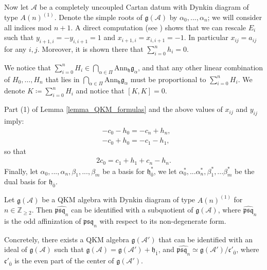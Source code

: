 \documentclass[12pt, a4paper, reqno]{amsart}
\def\AA{\mathcal{A}}
\def\ol{\overline}
\theoremstyle{definition}
\theoremstyle{definition}
\theoremstyle{definition}
\numberwithin{theorem}{section}
\numberwithin{lemma}{section}
\numberwithin{remark}{section}
\numberwithin{definition}{section}
\numberwithin{corollary}{section}
\numberwithin{proposition}{section}
\numberwithin{example}{section}
\begin{document}
	Now let $\AA$ be a completely uncoupled Cartan datum with Dynkin diagram of type $A(n)^{(1)}$.  Denote the simple roots of \(\mathfrak{g}(\mathcal{A})\) by \(\alpha_0,...,\alpha_n\); we will consider all indices mod \(n+1\).  A direct computation (see \cite{Si}) shows that we can rescale \(E_i\) such that \(y_{i+1,i} = - y_{i,i+1} = 1\) and \(x_{i+1,i} = x_{i,i+1} = -1\). In particular \(x_{ij} = a_{ij}\) for any \(i,j\). Moreover, it is shown there that \(\sum_{i=0}^n h_i = 0\). \par
	We notice that \(\sum_{i=0}^n H_i \in \bigcap_{\alpha\in\Pi}\mathrm{Ann}_{\mathfrak{h}}\mathfrak{g}_{\alpha}\), and that any other linear combination of \(H_0,\dots,H_n\) that lies in $\bigcap_{\alpha\in\Pi}\mathrm{Ann}_{\mathfrak{h}}\mathfrak{g}_{\alpha}$ must be proportional to \(\sum_{i=0}^n H_i\). 	We denote \(K \coloneq \sum_{i=0}^n H_i\) and notice that \([K,K] = 0\). 
	
	Part (1) of Lemma \ref{lemma_QKM_formulas} and the above values of \(x_{ij}\) and \(y_{ij}\) imply:
	\begin{align*}
		&-c_0 - h_0 = -c_n + h_n, \\
		&-c_0 + h_0 = -c_1 - h_1,
	\end{align*}
	so that
	\begin{align}\label{equation-psqn-realtions}
		2c_0 = c_1 + h_1 + c_n - h_n. 
	\end{align}
	Finally, let \(\alpha_0,...,\alpha_n,\beta_1,...,\beta_m\) be a basis for \(\mathfrak{h}_{\ol{0}}^*\), we let \(\alpha_0^*,...\alpha_n^*,\beta_1^*,...\beta_m^*\) be the dual basis for \(\mathfrak{h}_{\ol{0}}\).
	
	\begin{theorem}
		Let \(\mathfrak{g}(\mathcal{A})\) be a QKM algebra with Dynkin diagram of type \({A(n)}^{(1)}\) for \(n \in \mathbb{Z}_{\geq 2}\). Then \(\hat{\mathfrak{psq}_n}\) can be identified with a subquotient of \(\mathfrak{g}(\mathcal{A})\), where \(\hat{\mathfrak{psq}}_n\) is the odd affinization of \(\mathfrak{psq}_n\) with respect to its non-degenerate form. \par 
		Concretely, there exists a QKM algebra \(\mathfrak{g}(\mathcal{A}')\) that can be identified with an ideal of \(\mathfrak{g}(\mathcal{A})\) such that \(\mathfrak{g}(\mathcal{A}) =  \mathfrak{g}(\mathcal{A}') + \mathfrak{h}_{\ol{1}}\), and \(\hat{\mathfrak{psq}_n} \simeq \mathfrak{g}(\mathcal{A}')/\mathfrak{c}'_{\ol{0}}\), where \(\mathfrak{c}'_{\ol{0}}\) is the even part of the center of \(\mathfrak{g}(\mathcal{A}')\). 
	\end{theorem}
	
\end{document}
